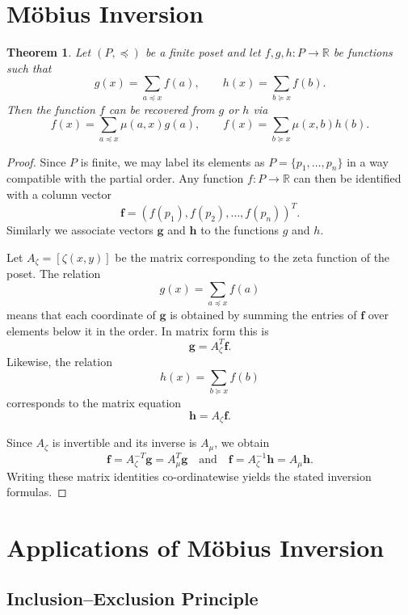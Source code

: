 \documentclass{amsart}
\numberwithin{equation}{section}
\theoremstyle{plain}
\newtheorem{theorem}{Theorem}[section]
\theoremstyle{definition}
\begin{document}
\section{M\"obius Inversion}
\begin{theorem}
Let $(P,\preceq)$ be a finite poset and let $f,g,h : P \to \mathbb{R}$ be functions such that
\begin{equation}
g(x)=\sum_{a \preceq x} f(a), \qquad 
h(x)=\sum_{b \succeq x} f(b).
\end{equation}
Then the function $f$ can be recovered from $g$ or $h$ via
\begin{equation}
f(x)=\sum_{a \preceq x}\mu(a,x)g(a), \qquad
f(x)=\sum_{b \succeq x}\mu(x,b)h(b).
\end{equation}
\end{theorem}

\begin{proof}
Since $P$ is finite, we may label its elements as $P=\{p_1,\dots,p_n\}$ in a way compatible with the partial order. Any function $f:P\to\mathbb{R}$ can then be identified with a column vector
\[
\mathbf{f} = (f(p_1),f(p_2),\ldots,f(p_n))^{T}.
\]
Similarly we associate vectors $\mathbf{g}$ and $\mathbf{h}$ to the functions $g$ and $h$.

Let $A_{\zeta}=[\zeta(x,y)]$ be the matrix corresponding to the zeta function of the poset. The relation
\[
g(x)=\sum_{a\preceq x}f(a)
\]
means that each coordinate of $\mathbf{g}$ is obtained by summing the entries of $\mathbf{f}$ over elements below it in the order. In matrix form this is
\[
\mathbf{g}=A_{\zeta}^{T}\mathbf{f}.
\]
Likewise, the relation
\[
h(x)=\sum_{b\succeq x}f(b)
\]
corresponds to the matrix equation
\[
\mathbf{h}=A_{\zeta}\mathbf{f}.
\]

Since $A_{\zeta}$ is invertible and its inverse is $A_{\mu}$, we obtain
\[
\mathbf{f}=A_{\zeta}^{-T}\mathbf{g}=A_{\mu}^{T}\mathbf{g}
\quad\text{and}\quad
\mathbf{f}=A_{\zeta}^{-1}\mathbf{h}=A_{\mu}\mathbf{h}.
\]
Writing these matrix identities co-ordinatewise yields the stated inversion formulas.
\end{proof}

\section{Applications of M\"obius Inversion}
\subsection{Inclusion--Exclusion Principle}
\end{document}
